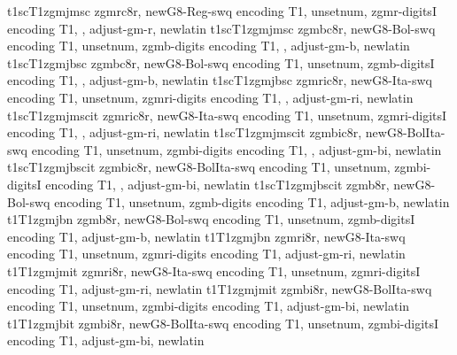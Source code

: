 {t1sc}{T1}{zgmj}{m}{sc}{}
%
{zgmrc8r,%
newG8-Reg-swq encoding T1,%
unsetnum,%
zgmr-digitsI encoding T1,%
\metrics {}  ,%
adjust-gm-r,%
newlatin}
{t1sc}{T1}{zgmj}{m}{sc}{}
%
{zgmbc8r,%
newG8-Bol-swq encoding T1,%
unsetnum,%
zgmb-digits encoding T1,%
\metrics {}  ,%
adjust-gm-b,%
newlatin}
{t1sc}{T1}{zgmj}{b}{sc}{}
%
{zgmbc8r,%
newG8-Bol-swq encoding T1,%
unsetnum,%
zgmb-digitsI encoding T1,%
\metrics {}  ,%
adjust-gm-b,%
newlatin}
{t1sc}{T1}{zgmj}{b}{sc}{}
%
{zgmric8r,%
newG8-Ita-swq encoding T1,%
unsetnum,%
zgmri-digits encoding T1,%
\metrics {}  ,%
adjust-gm-ri,%
newlatin}
{t1sc}{T1}{zgmj}{m}{scit}{}
%
{zgmric8r,%
newG8-Ita-swq encoding T1,%
unsetnum,%
zgmri-digitsI encoding T1,%
\metrics {}  ,%
adjust-gm-ri,%
newlatin}
{t1sc}{T1}{zgmj}{m}{scit}{}
%
{zgmbic8r,%
newG8-BolIta-swq encoding T1,%
unsetnum,%
zgmbi-digits encoding T1,%
\metrics {}  ,%
adjust-gm-bi,%
newlatin}
{t1sc}{T1}{zgmj}{b}{scit}{}
%
{zgmbic8r,%
newG8-BolIta-swq encoding T1,%
unsetnum,%
zgmbi-digitsI encoding T1,%
\metrics {}  ,%
adjust-gm-bi,%
newlatin}
{t1sc}{T1}{zgmj}{b}{scit}{}
%
{zgmb8r,%
newG8-Bol-swq encoding T1,%
unsetnum,%
zgmb-digits encoding T1,%
adjust-gm-b,%
newlatin}
{t1}{T1}{zgmj}{b}{n}{}
%
{zgmb8r,%
newG8-Bol-swq encoding T1,%
unsetnum,%
zgmb-digitsI encoding T1,%
adjust-gm-b,%
newlatin}
{t1}{T1}{zgmj}{b}{n}{}
%
{zgmri8r,%
newG8-Ita-swq encoding T1,%
unsetnum,%
zgmri-digits encoding T1,%
adjust-gm-ri,%
newlatin}
{t1}{T1}{zgmj}{m}{it}{}
%
{zgmri8r,%
newG8-Ita-swq encoding T1,%
unsetnum,%
zgmri-digitsI encoding T1,%
adjust-gm-ri,%
newlatin}
{t1}{T1}{zgmj}{m}{it}{}
%
{zgmbi8r,%
newG8-BolIta-swq encoding T1,%
unsetnum,%
zgmbi-digits encoding T1,%
adjust-gm-bi,%
newlatin}
{t1}{T1}{zgmj}{b}{it}{}
%
{zgmbi8r,%
newG8-BolIta-swq encoding T1,%
unsetnum,%
zgmbi-digitsI encoding T1,%
adjust-gm-bi,%
newlatin}
